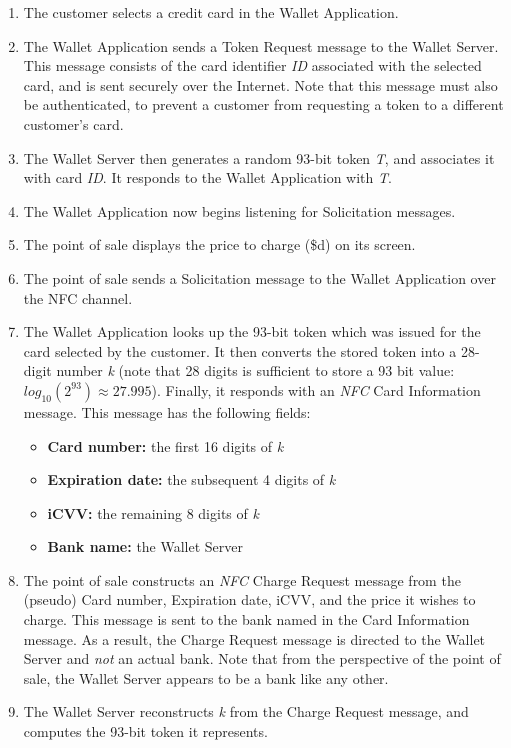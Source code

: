 \begin{enumerate}
\item The customer selects a credit card in the Wallet Application.
\item The Wallet Application sends a Token Request message to the Wallet Server.
    This message consists of the card identifier \emph{ID} associated with the selected card, and is sent securely over the Internet.
    Note that this message must also be authenticated, to prevent a customer from requesting a token to a different customer's card.
\item The Wallet Server then generates a random 93-bit token \emph{T}, and associates it with card \emph{ID}.
    It responds to the Wallet Application with \emph{T}.
\item The Wallet Application now begins listening for Solicitation messages.
\item The point of sale displays the price to charge (\$d) on its screen.
\item The point of sale sends a Solicitation message to the Wallet Application over the NFC channel.
\item The Wallet Application looks up the 93-bit token which was issued for the card selected by the customer.
    It then converts the stored token into a 28-digit number \emph{k}
    (note that 28 digits is sufficient to store a 93 bit value: $log_{10}(2^{93}) \approx 27.995$).
    Finally, it responds with an \emph{NFC} Card Information message.
    This message has the following fields:
    \begin{itemize}
    \item \textbf{Card number:} the first 16 digits of \emph{k}
    \item \textbf{Expiration date:} the subsequent 4 digits of \emph{k}
    \item \textbf{iCVV:} the remaining 8 digits of \emph{k}
    \item \textbf{Bank name:} the Wallet Server
   	\end{itemize}
\item The point of sale constructs an \emph{NFC} Charge Request message from the (pseudo) Card number, Expiration date, iCVV, and the price it wishes to charge.
    This message is sent to the bank named in the Card Information message.
    As a result, the Charge Request message is directed to the Wallet Server and \emph{not} an actual bank.
    Note that from the perspective of the point of sale, the Wallet Server appears to be a bank like any other.
\item The Wallet Server reconstructs \emph{k} from the Charge Request message, and computes the 93-bit token it represents.

\end{enumerate}
